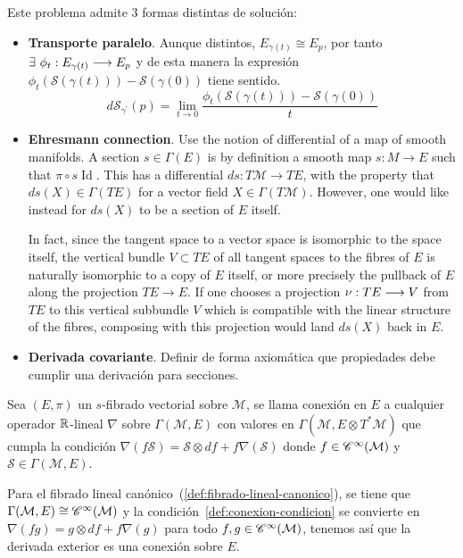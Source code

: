 Este problema admite 3 formas distintas de solución:
\begin{itemize}
  \item \textbf{Transporte paralelo}.
  Aunque distintos, $E_{\gamma(t)}\cong E_p$, por tanto $\exists\ \phi_t:E_{\gamma(t)
  }\longrightarrow E_p$ y de esta manera la expresión $\phi_t(\mathcal{S}(\gamma (t)))-\mathcal{S}(\gamma (0))$ tiene sentido.
  \[
    d\mathcal{S}_{\gamma^{'}}(p)=\lim_{t\to 0}\frac{\phi_t(\mathcal{S}(\gamma (t)))-\mathcal{S}
    (\gamma (0))}{t}
  \]

  \item \textbf{Ehresmann connection}.
  Use the notion of differential of a map of smooth manifolds.
  A section $s\in \Gamma (E)$ is by definition a smooth map $s:M\to E$ such
  that $\pi \circ s\operatorname{Id}$.
  This has a differential $ds:T\mathcal{M}\to TE$, with the property that $ds(X)\in \Gamma (TE)$
  for a vector field $X\in \Gamma (T\mathcal{M})$.
  However, one would like instead for $ds(X)$ to be a section of $E$ itself.

  In fact, since the tangent space to a vector space is isomorphic to the space itself, the vertical bundle
  $V\subset TE$ of all tangent spaces to the fibres of $E$ is naturally isomorphic to a copy of $E$
  itself, or more precisely the pullback of $E$ along the projection $TE\to E$.
  If one chooses a projection $\nu:TE\longrightarrow V$ from $TE$ to this vertical subbundle
  $V$ which is compatible with the linear structure of the fibres, composing with this projection would land
  $ds(X)$ back in $E$.


  \item \textbf{Derivada covariante}.
  Definir de forma axiomática que propiedades debe cumplir una derivación para secciones.
\end{itemize}

\begin{definition}
  Sea $(E, \pi)$ un $s$-fibrado vectorial sobre $\mathcal{\mathcal{M}}$, se llama conexión en $E$ a cualquier operador $\mathbb{R}$-lineal
  $\nabla$ sobre $\Gamma(\mathcal{M}, E)$ con valores en $\Gamma(\mathcal{M}, E\otimes T^* \mathcal{M})$ que cumpla la condición $\nabla(f\mathcal{S})
  =\mathcal{S}\otimes df+f\nabla(\mathcal{S})$\label{def:conexion-condicion} donde $f\in\mathscr{C}^\infty(\mathcal{M})$ y
  $\mathcal{S}\in\Gamma(\mathcal{M}, E)$.
\end{definition}

Para el fibrado lineal canónico~(\ref{def:fibrado-lineal-canonico}), se tiene que $\Gamma(\mathcal{M}, E)
\cong\mathscr{C}^\infty(\mathcal{M})$ y la condición~\ref{def:conexion-condicion} se convierte en $\nabla(fg)=g\otimes df+f\nabla(g)$
para todo $f,g\in\mathscr{C}^\infty(\mathcal{M})$, tenemos así que la derivada exterior es una conexión sobre $E$.


